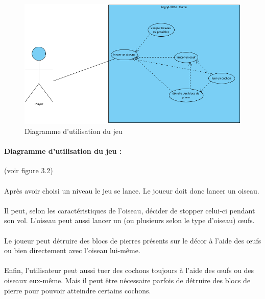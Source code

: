 \documentclass[a4paper,12pt]{report}
\begin{document}
\begin{figure}[H]
\begin{center}
\includegraphics[scale=0.7]{images/UseCase2.png} 
\end{center}
\caption{Diagramme d'utilisation du jeu}
\label{Diagramme d'utilisation du jeu}
\end{figure}

\paragraph{Diagramme d'utilisation du jeu :}(voir figure 3.2)

\paragraph{}Après avoir choisi un niveau le jeu se lance. Le joueur doit donc lancer un oiseau.
\paragraph{}Il peut, selon les caractéristiques de l'oiseau, décider de stopper celui-ci pendant son vol. L'oiseau peut aussi lancer un (ou plusieurs selon le type d'oiseau) œufs.
\paragraph{}Le joueur peut détruire des blocs de pierres présents sur le décor à l'aide des œufs ou bien directement avec l'oiseau lui-même.
\paragraph{}Enfin, l'utilisateur peut aussi tuer des cochons toujours à l'aide des œufs ou des oiseaux eux-même. Mais il peut être nécessaire parfois de détruire des blocs de pierre pour pouvoir atteindre certains cochons.
\end{document}
